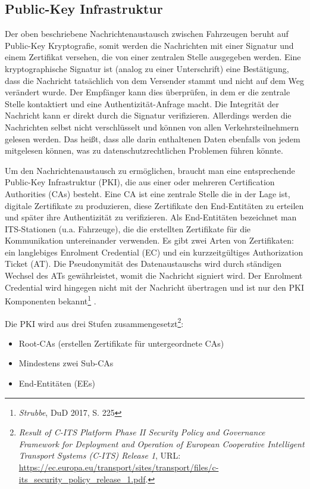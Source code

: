 \subsection{Public-Key Infrastruktur}
\label{sec:FirstContentSection:FirstSubSection}

Der oben beschriebene Nachrichtenaustausch zwischen Fahrzeugen beruht auf Public-Key Kryptografie, somit werden die Nachrichten mit einer Signatur und einem Zertifikat versehen, die von einer zentralen Stelle ausgegeben werden. Eine kryptographische Signatur ist (analog zu einer Unterschrift) eine Bestätigung, dass die Nachricht tatsächlich von dem Versender stammt und nicht auf dem Weg verändert wurde. Der Empfänger kann dies überprüfen, in dem er die zentrale Stelle kontaktiert und eine Authentizität-Anfrage macht. Die Integrität der Nachricht kann er direkt durch die Signatur verifizieren. Allerdings werden die Nachrichten selbst nicht verschlüsselt und können von allen Verkehrsteilnehmern gelesen werden. Das heißt, dass alle darin enthaltenen Daten ebenfalls von jedem mitgelesen können, was zu datenschutzrechtlichen Problemen führen könnte. 
 
Um den Nachrichtenaustausch zu ermöglichen, braucht man eine entsprechende Public-Key Infrastruktur (PKI), die aus einer oder mehreren Certification Authorities (CAs) besteht. Eine CA ist eine zentrale Stelle die in der Lage ist, digitale Zertifikate zu produzieren, diese Zertifikate den End-Entitäten zu erteilen und später ihre Authentizität zu verifizieren. Als End-Entitäten bezeichnet man ITS-Stationen (u.a. Fahrzeuge), die die erstellten Zertifikate für die Kommunikation untereinander verwenden. Es gibt zwei Arten von Zertifikaten: ein langlebiges Enrolment Credential (EC) und ein kurzzeitgültiges Authorization Ticket (AT). Die Pseudonymität des Datenaustauschs wird durch ständigen Wechsel des ATs gewährleistet, womit die Nachricht signiert wird. Der Enrolment Credential wird hingegen nicht mit der Nachricht übertragen und ist nur den PKI Komponenten bekannt\footnote{\emph{Strubbe}, DuD 2017, S. 225} \nocite{Strubbe2017}. 

Die PKI wird aus drei Stufen zusammengesetzt\footnote{\emph{Result of C-ITS Platform Phase II Security Policy and Governance Framework for Deployment and Operation of European Cooperative Intelligent Transport Systems (C-ITS) Release 1}, URL: \url{https://ec.europa.eu/transport/sites/transport/files/c-its\_security\_policy\_release\_1.pdf}.}\nocite{SecurityCITS}: 
\begin{itemize}
	\item Root-CAs (erstellen Zertifikate für untergeordnete CAs)
	\item Mindestens zwei Sub-CAs
	\item End-Entitäten (EEs)
\end{itemize}

